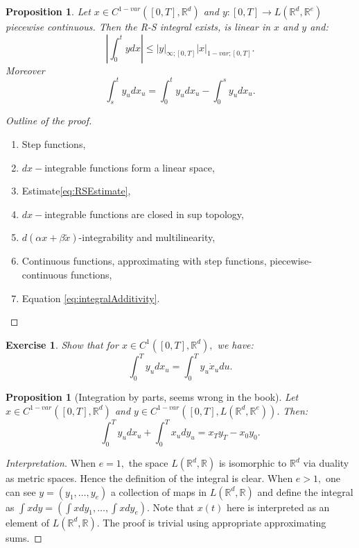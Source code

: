 \documentclass{article}
\newcommand{\R}{\mathbb{R}}
\newtheorem{prop}[theorem]{Proposition}
\newtheorem{exercise}{Exercise}
\begin{document}
\begin{prop}
    Let $x \in C^{1-var}([0,T],\R^d)$ and $y:[0,T] \rightarrow L(\R^d, \R^e)$ piecewise continuous. Then the R-S integral exists, is linear in $x$ and $y$ and:
    \begin{equation}\label{eq:RSEstimate}
        \left| \int_0^t y dx \right| \leq |y|_{\infty;[0,T]} |x|_{1-var; [0,T]}.
    \end{equation}
    Moreover
    \begin{equation}\label{eq:integralAdditivity}
        \int_s^t y_u dx_u = \int_0^t y_u dx_u - \int_0^s y_u dx_u.
    \end{equation}
\end{prop}
\begin{proof}[Outline of the proof]
    \begin{enumerate}
        \item Step functions,
        \item $dx-$integrable functions form a linear space,
        \item Estimate\ref{eq:RSEstimate},
        \item $dx-$integrable functions are closed in sup topology,
        \item $d(\alpha x + \beta \tilde{x})$-integrability and multilinearity,
        \item Continuous functions, approximating with step functions, piecewise-continuous functions,
        \item Equation \ref{eq:integralAdditivity}.
    \end{enumerate}
\end{proof}

\begin{exercise}
    Show that for $x \in C^1([0,T],\R^d),$ we have:
    \begin{equation}
        \int_0^T y_u dx_u = \int_0^T y_u \dot{x}_u du.
    \end{equation}
\end{exercise}

\begin{prop}[Integration by parts, seems wrong in the book]
    Let $x \in C^{1-var}([0,T],\R^d)$ and $y\in C^{1-var}([0,T], L(\R^d, \R^e)).$ Then:
    \begin{equation}
        \int_0^T y_u dx_u + \int_0^T x_u dy_u = x_T y_T - x_0 y_0.
    \end{equation}
\end{prop}
\begin{proof}[Interpretation]
    When $e=1,$ the space $L(\R^d, \R)$ is isomorphic to $\R^d$ via duality as metric spaces. 
    Hence the definition of the integral is clear.
    When $e>1,$ one can see $y = (y_1, \ldots, y_e)$ a collection of maps in $L(\R^d, \R)$ and define the integral as $\int x dy = (\int x dy_1, \ldots, \int x dy_e).$
    Note that $x(t)$ here is interpreted as an element of $L(\R^d, \R).$
    The proof is trivial using appropriate approximating sums.
\end{proof}
\end{document}
